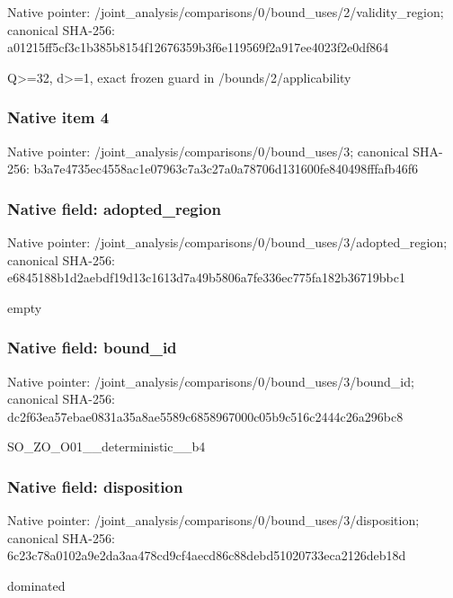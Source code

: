\documentclass[10pt,a4paper]{article}
\begin{document}
Native pointer: /joint\_analysis/comparis\allowbreak{}ons/0/bound\_uses/2/valid\allowbreak{}ity\_region; canonical SHA-256: a01215ff5cf3c1b385b8154f\allowbreak{}12676359b3f6e119569f2a91\allowbreak{}7ee4023f2e0df864


Q>=32, d>=1, exact frozen guard in /bounds/2/applicability


\subsubsection{Native item 4}


Native pointer: /joint\_analysis/comparis\allowbreak{}ons/0/bound\_uses/3; canonical SHA-256: b3a7e4735ec4558ac1e07963\allowbreak{}c7a3c27a0a78706d131600fe\allowbreak{}840498fffafb46f6



\subsubsection{Native field: adopted\_region}


Native pointer: /joint\_analysis/comparis\allowbreak{}ons/0/bound\_uses/3/adopt\allowbreak{}ed\_region; canonical SHA-256: e6845188b1d2aebdf19d13c1\allowbreak{}613d7a49b5806a7fe336ec77\allowbreak{}5fa182b36719bbc1


empty


\subsubsection{Native field: bound\_id}


Native pointer: /joint\_analysis/comparis\allowbreak{}ons/0/bound\_uses/3/bound\allowbreak{}\_id; canonical SHA-256: dc2f63ea57ebae0831a35a8a\allowbreak{}e5589c6858967000c05b9c51\allowbreak{}6c2444c26a296bc8


SO\_ZO\_O01\_\_deterministic\_\_b4


\subsubsection{Native field: disposition}


Native pointer: /joint\_analysis/comparis\allowbreak{}ons/0/bound\_uses/3/dispo\allowbreak{}sition; canonical SHA-256: 6c23c78a0102a9e2da3aa478\allowbreak{}cd9cf4aecd86c88debd51020\allowbreak{}733eca2126deb18d


dominated
\end{document}
